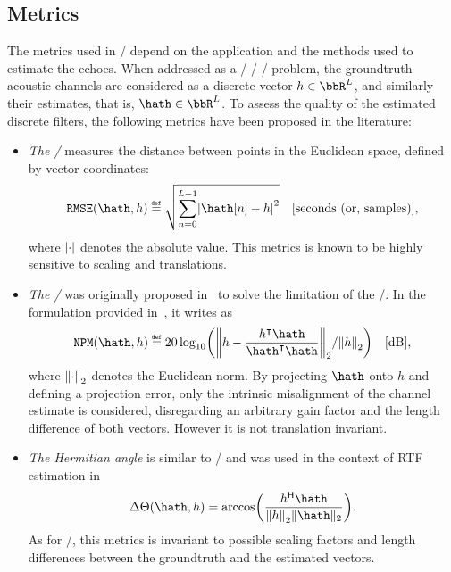 \subsection{Metrics}\label{subsec:estimation:metrics}
The metrics used in \AER/ depend on the application and the methods used to estimate the echoes.
When addressed as a \FIR/ \SIMO/ \BCE/ problem, the groundtruth acoustic channels are considered as a discrete vector $h \in \bbR^L$, and similarly their estimates, that is, $\hath \in \bbR^L$.
To assess the quality of the estimated discrete filters, the following metrics have been proposed in the literature:
\begin{itemize}
    \item \textit{The \RMSEtxt/}  measures the distance between points in the Euclidean space, defined by vector coordinates:
    \begin{equation}
        \RMSE(\hath, h) \eqdef \sqrt{\sum_{n=0}^{L-1} \abs{\hath[n] - h}^2} \quad \text{[seconds (or, samples)]}
        ,
    \end{equation}
    where $\abs{\cdot}$ denotes the absolute value.
    This metrics is known to be highly sensitive to scaling and translations.

    \item \textit{The \NPMtxt/}  was originally proposed in~ to solve the limitation of the \RMSEtxt/.
    In the formulation provided in~, it writes as
    \begin{equation}
        \NPM(\hath,h) \eqdef 20 \log_{10} \kparen{ \norm{h - \frac{\ktranspose{h}\hath}{\ktranspose{\hath} \hath}}_2 / \norm{h}_2} \quad \text{[dB]}
        ,
    \end{equation}
    where $\norm{\cdot}_2$ denotes the Euclidean norm.
    By projecting $\hath$ onto $h$ and defining a projection error, only the intrinsic misalignment of the channel estimate is considered, disregarding an arbitrary gain factor and the length difference of both vectors.
    However it is not translation invariant.

    \item \textit{The Hermitian angle} is similar to \NPMtxt/ and was used in the context of RTF estimation in~
    \begin{equation}
        \Delta\Theta(\hath,h) = \arccos\kparen{\frac{\khermitian{h}\hath}{\norm{h}_2\|\hath\|_2}}
        .
    \end{equation}
    As for \NPMtxt/, this metrics is invariant to possible scaling factors and length differences between the groundtruth and the estimated vectors.
\end{itemize}

